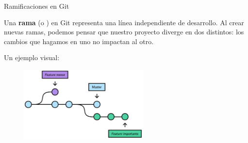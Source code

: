\begin{frame}[t]{Ramificaciones en Git}


    Una \textbf{rama} (o ) en Git representa una línea independiente de desarrollo.
    Al crear nuevas ramas, podemos pensar que nuestro proyecto diverge en dos distintos:
    los cambios que hagamos en uno no impactan al otro.

    \pause
    \vspace{0.5em}
    Un ejemplo visual:

    \begin{figure}[ht]
        \begin{center}
            \includegraphics[height=1.5in]{images/branch.pdf}
        \end{center}
    \end{figure}




\end{frame}

